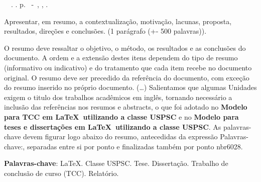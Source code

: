 \setlength{\absparsep}{18pt} %
\begin{resumo}
	\begin{flushleft} 
			\setlength{\absparsep}{0pt} %
			\SingleSpacing 
			\imprimirautorabr~~\textbf{\imprimirtituloresumo}.	\imprimirdata. \pageref{LastPage} p. 
			\imprimirtipotrabalho~-~\imprimirinstituicao, \imprimirlocal, \imprimirdata. 
 	\end{flushleft}
\OnehalfSpacing 

Apresentar, em resumo, a contextualização, motivação, lacunas, proposta, resultados, direções e conclusões. (1 parágrafo (+- 500 palavras)).

 O resumo deve ressaltar o  objetivo, o método, os resultados e as conclusões do documento. A ordem e a extensão  destes itens dependem do tipo de resumo (informativo ou indicativo) e do  tratamento que cada item recebe no documento original. O resumo deve ser
 precedido da referência do documento, com exceção do resumo inserido no
 próprio documento. (\ldots)  Salientamos que algumas Unidades exigem o titulo dos trabalhos acadêmicos em inglês, tornando necessário a inclusão das referências nos resumos e abstracts, o que foi adotado no \textbf{Modelo para TCC em \LaTeX\ utilizando a classe USPSC} e no \textbf{Modelo para teses e dissertações em \LaTeX\ utilizando a classe USPSC}. As palavras-chave devem figurar logo abaixo do  resumo, antecedidas da expressão Palavras-chave:, separadas entre si por  ponto e finalizadas também por ponto nbr6028.
 

 \textbf{Palavras-chave}: LaTeX. Classe USPSC. Tese. Dissertação. Trabalho de conclusão de curso (TCC). Relatório.
\end{resumo}